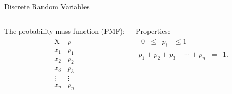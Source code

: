 \begin{frame}{Discrete Random Variables}

  \begin{columns}

    The probability mass function (PMF):
    \begin{eqnarray*}
      \begin{array}{l|l}
        \mathrm{X} & p \\ \hline
        x_1 & p_1 \\
        x_2 & p_2 \\
        x_3 & p_3 \\
        \vdots & \vdots \\
        x_n & p_n
      \end{array}
    \end{eqnarray*}

    Properties:
    \begin{eqnarray*}
      \begin{array}{rcccl}
        0 & \leq & p_i & \leq 1
      \end{array}
      \\
      p_1 + p_2 + p_3 + \cdots + p_n & = & 1.
    \end{eqnarray*}

  \end{columns}
  
\end{frame}



